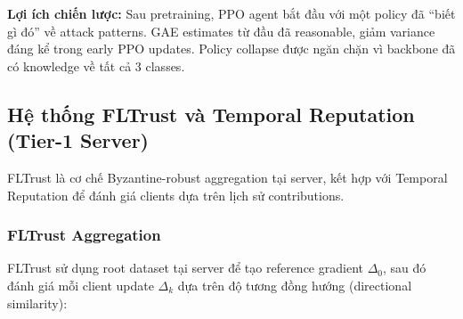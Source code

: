 \documentclass[12pt,a4paper]{article}
\begin{document}
\textbf{Lợi ích chiến lược:} Sau pretraining, PPO agent bắt đầu với một policy đã ``biết gì đó'' về attack patterns. GAE estimates từ đầu đã reasonable, giảm variance đáng kể trong early PPO updates. Policy collapse được ngăn chặn vì backbone đã có knowledge về tất cả 3 classes.

\subsection{Hệ thống FLTrust và Temporal Reputation (Tier-1 Server)}

FLTrust là cơ chế Byzantine-robust aggregation tại server, kết hợp với Temporal Reputation để đánh giá clients dựa trên lịch sử contributions.

\subsubsection{FLTrust Aggregation}

FLTrust sử dụng root dataset tại server để tạo reference gradient $\Delta_0$, sau đó đánh giá mỗi client update $\Delta_k$ dựa trên độ tương đồng hướng (directional similarity):
\end{document}

